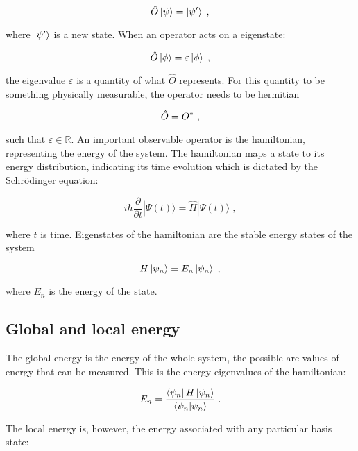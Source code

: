 \begin{equation}
    \hat{O}\ket{\psi} = \ket{\psi'} \; ,
\end{equation}

where $\ket{\psi'}$ is a new state. When an operator acts on a eigenstate:

\begin{equation}
    \hat{O}\ket{\phi} = \varepsilon\ket{\phi} \; ,
\end{equation}

the eigenvalue $\varepsilon$ is a quantity of what $\hat{O}$ represents. For this quantity to be something physically measurable, the operator needs to be hermitian 

\begin{equation}
    \hat{O} = \hc{O} \; ,
\end{equation}

such that $\varepsilon \in \mathbb{R}$. An important observable operator is the hamiltonian, representing the energy of the system. The hamiltonian maps a state to its energy distribution, indicating its time evolution which is dictated by the Schrödinger equation:

\begin{equation}
    i\hbar\frac{\partial}{\partial t} |\Psi(t)\rangle = \hat{H} |\Psi(t)\rangle \; ,
\end{equation}

where $t$ is time. Eigenstates of the hamiltonian are the stable energy states of the system

\begin{equation}
    H\ket{\psi_n} = E_n\ket{\psi_n} \; ,
\end{equation}

where $E_n$ is the energy of the state.

\subsection{Global and local energy}

The global energy is the energy of the whole system, the possible are values of energy that can be measured. This is the energy eigenvalues of the hamiltonian:

\begin{equation}
    E_n = \frac{\bra{\psi_n}H\ket{\psi_n}}{\braket{\psi_n}{\psi_n}} \; .
\end{equation}

The local energy is, however, the energy associated with any particular basis state:

